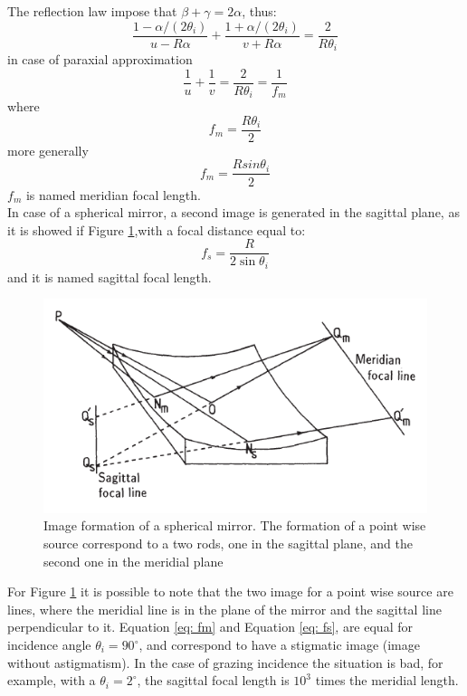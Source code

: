 \noindent The reflection law impose that $\beta + \gamma = 2 \alpha$, thus:
\begin{equation}
\frac{1 - \alpha / (2 \theta_i)}{u - R \alpha} + \frac{1 + \alpha / (2 \theta_i)}{v + R \alpha} = \frac{2}{R \theta_i}
\label{eq: refle lae}
\end{equation}
\noindent in case of paraxial approximation
\begin{equation}
\frac{1}{u} + \frac{1}{v} = \frac{2}{R \theta_i} = \frac{1}{f_m}
\label{eq: reflection law}
\end{equation}
\noindent where
\begin{equation}
f_m = \frac{R \theta_i}{2}
\label{eq: fm}
\end{equation}
\noindent more generally
\begin{equation}
f_m = \frac{R sin \theta_i}{2}
\label{eq: fm2}
\end{equation}
\noindent $f_m $ is named meridian focal length. 
\\
In case of a spherical mirror, a second image is generated in the sagittal plane, as it is showed if Figure \ref{fig: MeridianAndSagittal},with a focal distance equal to:
\begin{equation}
f_s = \frac{R}{2 \sin \theta_i}
\label{eq: fs}
\end{equation}
\noindent and it is named sagittal focal length.
\begin{figure}[]
%
\centering
%
\includegraphics[width=.6\textwidth]{Immagini/Chapter2/MeridianAndSagittal}
%
\caption{Image formation of a spherical mirror. The formation of a point wise source correspond to a two rods, one in the sagittal plane, and the second one in the meridial plane}
%
\label{fig: MeridianAndSagittal}
%
\end{figure}
\noindent For Figure \ref{fig: MeridianAndSagittal} it is possible to note that the two image for a point wise source are lines, where the meridial line is in the plane of the mirror and the sagittal line perpendicular to it. Equation \ref{eq: fm} and Equation \ref{eq: fs}, are equal for incidence angle $\theta_i = 90^{\circ} $, and correspond to have a stigmatic image (image without astigmatism). In the case of grazing incidence the situation is bad, for example, with a $\theta_i = 2^{\circ} $, the sagittal focal length is $10^3$ times the meridial length.
